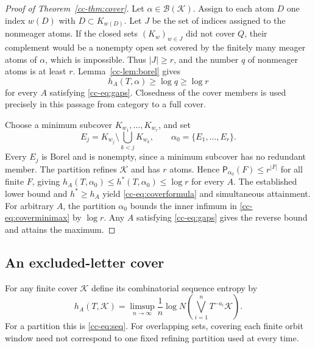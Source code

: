 \documentclass[11pt,reqno]{amsart}
\numberwithin{equation}{section}
\theoremstyle{definition}
\theoremstyle{definition}
\newcommand{\Patt}{\mathsf P}
\newcommand{\hpat}{h^{*}}
\newcommand{\K}{\mathcal K}
\begin{document}
\begin{proof}[Proof of Theorem~\ref{cc-thm:cover}]
Let $\alpha\in\mathcal B(\K)$. Assign to each atom $D$ one index
$w(D)$ with $D\subset K_{w(D)}$. Let $J$ be the set of indices assigned
to the nonmeager atoms. If the closed sets $(K_w)_{w\in J}$ did not
cover $Q$, their complement would be a nonempty open set covered by
the finitely many meager atoms of $\alpha$, which is impossible.
Thus $|J|\ge r$, and the number $q$ of nonmeager atoms is at least $r$.
Lemma~\ref{cc-lem:borel} gives
\[
 h_A(T,\alpha)\ge\log q\ge\log r
\]
for every $A$ satisfying \eqref{cc-eq:gaps}. Closedness of the cover
members is used precisely in this passage from category to a full cover.

Choose a minimum subcover $K_{w_1},\ldots,K_{w_r}$, and set
\begin{equation}\label{cc-eq:ordered}
 E_j=K_{w_j}\setminus\bigcup_{k<j}K_{w_k},\qquad
 \alpha_0=\{E_1,\ldots,E_r\}.
\end{equation}
Every $E_j$ is Borel and is nonempty, since a minimum subcover has no
redundant member. The partition refines $\K$ and has $r$ atoms. Hence
$\Patt_{\alpha_0}(F)\le r^{|F|}$ for all finite $F$, giving
$h_A(T,\alpha_0)\le\hpat(T,\alpha_0)\le\log r$ for every $A$.
The established lower bound and $\hpat\ge h_A$ yield
\eqref{cc-eq:coverformula} and simultaneous attainment.
For arbitrary $A$, the partition $\alpha_0$ bounds the inner infimum
in \eqref{cc-eq:coverminimax} by $\log r$. Any $A$ satisfying
\eqref{cc-eq:gaps} gives the reverse bound and attains the maximum.
\end{proof}


\subsection{An excluded-letter cover}

For any finite cover $\K$ define its combinatorial sequence entropy by
\[
 h_A(T,\K)=\limsup_{n\to\infty}\frac1n
 \log N\left(\bigvee_{i=1}^n T^{-a_i}\K\right).
\]
For a partition this is \eqref{cc-eq:seq}. For overlapping sets, covering
each finite orbit window need not correspond to one fixed refining
partition used at every time.
\end{document}
